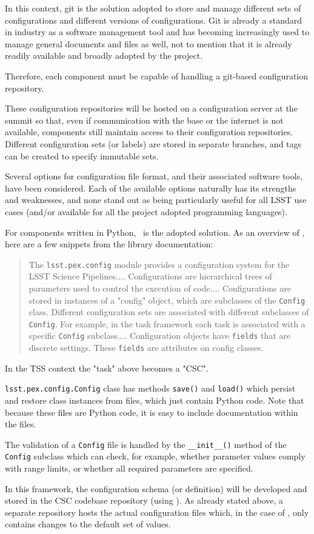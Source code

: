 In this context, git is the solution adopted to store and manage different sets of configurations and different versions of 
configurations. Git is already a standard in industry as a software management tool and has becoming increasingly used 
to manage general documents and files as well, not to mention that it is already readily available and broadly adopted by the 
project. {\color{blue} Therefore, each component must be capable of handling a git-based configuration repository.

These configuration repositories will be hosted on a configuration server at the summit so that, even if communication with the 
base or the internet is not available, components still maintain access to their configuration repositories. Different 
configuration sets (or labels) are stored in separate branches, and tags can be created to specify immutable sets.

Several options for configuration file format, and their associated software tools, have been considered. Each of the 
available options naturally has its strengths and weaknesses, and none stand out as being particularly useful for all LSST 
use cases (and/or available for all the project adopted programming languages).

For components written in Python, \pexC~is the adopted solution. As an overview of \pexC, here are a few snippets from 
the library documentation:

\begin{quotation}
The \texttt{lsst.pex.config} module provides a configuration system for the LSST Science Pipelines.... Configurations are 
hierarchical trees of parameters used to control the execution of code.... Configurations are stored in instances of a 
"config" object, which are subclasses of the \texttt{Config} class. Different configuration sets are associated with different 
subclasses of \texttt{Config}. For example, in the task framework each task is associated with a specific \texttt{Config} 
subclass.... Configuration objects have \texttt{fields} that are discrete settings. These \texttt{fields} are attributes on 
config classes.
\end{quotation}

In the TSS context the "task" above becomes a "CSC".

\texttt{lsst.pex.config.Config} class has methods \texttt{save()} and \texttt{load()} which persist and restore class instances 
from files, which just contain Python code. Note that because these files are Python code, it is easy to include documentation 
within the files.

The validation of a \texttt{Config} file is handled by the \texttt{\_\_init\_\_()} method of the \texttt{Config} subclass which can 
check, for example, whether parameter values comply with range limits, or whether all required parameters are specified.

In this framework, the configuration schema (or definition) will be developed and stored in the CSC codebase repository 
(using \pexC). As already stated above, a separate repository hosts the actual configuration files which, in the case of 
\pexC, only contains changes to the default set of values.} 







